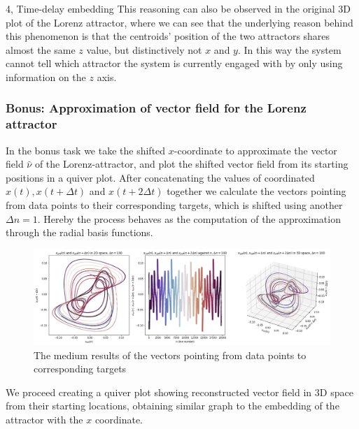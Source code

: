 \documentclass[10pt,a4paper]{article}
\begin{document}
\begin{task}{4, Time-delay embedding}
This reasoning can also be observed in the original 3D plot of the Lorenz attractor, where we can see that the underlying reason behind this phenomenon is that the centroids' position of the two attractors shares almost the same $z$ value, but distinctively not $x$ and $y$. In this way the system cannot tell which attractor the system is currently engaged with by only using information on the $z$ axis.

\subsubsection*{Bonus: Approximation of vector field for the Lorenz attractor}

In the bonus task we take the shifted $x$-coordinate to approximate the vector field $\hat{\nu}$ of the Lorenz-attractor, and plot the shifted vector field from its starting positions in a quiver plot. After concatenating the values of coordinated $x(t), x(t+\Delta t)$ and $x(t+2\Delta t)$ together we calculate the vectors pointing from data points to their corresponding targets, which is shifted using another $\Delta n=1$. Hereby the process behaves as the computation of the approximation through the radial basis functions.

\begin{figure}[H]
    \centering
    \includegraphics[width=13cm]{images/task4-3-1.png}
    \caption{The medium results of the vectors pointing from data points to corresponding targets}
    \label{task4-3-1}
\end{figure}

We proceed creating a quiver plot showing reconstructed vector field in 3D space from their starting locations, obtaining similar graph to the embedding of the attractor with the $x$ coordinate.


\end{task}
\end{document}
